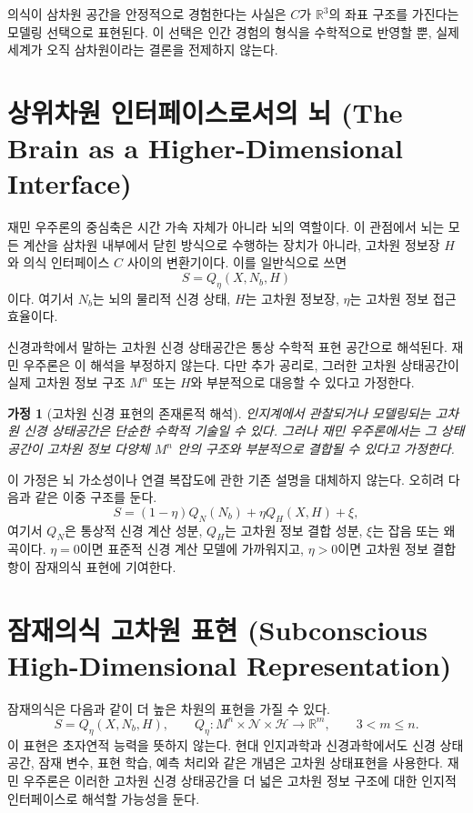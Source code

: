 \documentclass[11pt]{article}
\newtheorem{assumption}{가정}
\theoremstyle{remark}
\begin{document}
의식이 삼차원 공간을 안정적으로 경험한다는 사실은 $C$가
$\mathbb{R}^3$의 좌표 구조를 가진다는 모델링 선택으로 표현된다. 이 선택은
인간 경험의 형식을 수학적으로 반영할 뿐, 실제 세계가 오직 삼차원이라는
결론을 전제하지 않는다.

\section{상위차원 인터페이스로서의 뇌 (The Brain as a Higher-Dimensional Interface)}

재민 우주론의 중심축은 시간 가속 자체가 아니라
뇌의 역할이다. 이 관점에서 뇌는 모든 계산을 삼차원 내부에서 닫힌 방식으로
수행하는 장치가 아니라, 고차원 정보장 $H$와 의식 인터페이스 $C$ 사이의
변환기이다. 이를 일반식으로 쓰면
\begin{equation}
  S = Q_\eta(X,N_b,H)
  \label{eq:q-eta}
\end{equation}
이다. 여기서 $N_b$는 뇌의 물리적 신경 상태, $H$는 고차원 정보장,
$\eta$는 고차원 정보 접근 효율이다.

신경과학에서 말하는 고차원 신경 상태공간은 통상 수학적 표현 공간으로
해석된다. 재민 우주론은 이 해석을 부정하지 않는다. 다만 추가 공리로,
그러한 고차원 상태공간이 실제 고차원 정보 구조 $M^n$ 또는 $H$와 부분적으로
대응할 수 있다고 가정한다.

\begin{assumption}[고차원 신경 표현의 존재론적 해석]
인지계에서 관찰되거나 모델링되는 고차원 신경 상태공간은 단순한 수학적
기술일 수 있다. 그러나 재민 우주론에서는 그 상태공간이 고차원 정보 다양체
$M^n$ 안의 구조와 부분적으로 결합될 수 있다고 가정한다.
\end{assumption}

이 가정은 뇌 가소성이나 연결 복잡도에 관한 기존 설명을 대체하지 않는다.
오히려 다음과 같은 이중 구조를 둔다.
\begin{equation}
  S = (1-\eta)Q_N(N_b) + \eta Q_H(X,H) + \xi,
  \label{eq:interface-mixture}
\end{equation}
여기서 $Q_N$은 통상적 신경 계산 성분, $Q_H$는 고차원 정보 결합 성분,
$\xi$는 잡음 또는 왜곡이다. $\eta=0$이면 표준적 신경 계산 모델에 가까워지고,
$\eta>0$이면 고차원 정보 결합 항이 잠재의식 표현에 기여한다.

\section{잠재의식 고차원 표현 (Subconscious High-Dimensional Representation)}

잠재의식은 다음과 같이 더 높은 차원의 표현을 가질 수 있다.
\begin{equation}
  S=Q_\eta(X,N_b,H), \qquad Q_\eta:M^n\times\mathcal{N}\times\mathcal{H}\to\mathbb{R}^m,
  \qquad 3<m\le n.
\end{equation}
이 표현은 초자연적 능력을 뜻하지 않는다. 현대 인지과학과 신경과학에서도
신경 상태공간, 잠재 변수, 표현 학습, 예측 처리와 같은 개념은 고차원
상태표현을 사용한다. 재민 우주론은 이러한 고차원 신경 상태공간을 더
넓은 고차원 정보 구조에 대한 인지적 인터페이스로 해석할 가능성을 둔다.
\end{document}
